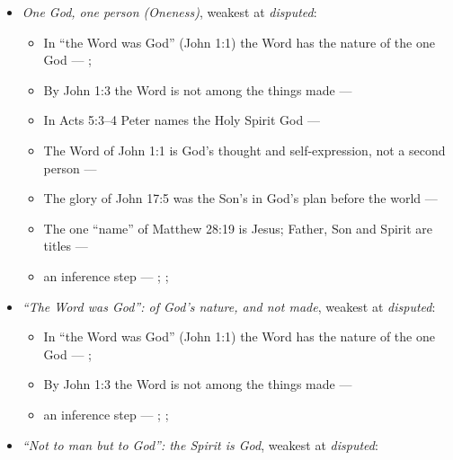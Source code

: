 \documentclass[11pt,paper=\testimonypaper,DIV=13,parskip=false]{scrartcl}
\begin{document}
\begin{itemize}
\item \emph{One God, one person (Oneness)}, weakest at \emph{disputed}:
\begin{itemize}
\item In “the Word was God” (John 1:1) the Word has the nature of the one God --- \cite{harner-qualitative-anarthrous-1973}; \cite[3, The Triune God]{kibbey-living-systematic-theology-2026}
\item By John 1:3 the Word is not among the things made --- \cite[Tractates on John I.11]{schaff-nicene-post-nicene-fathers-1-7}
\item In Acts 5:3–4 Peter names the Holy Spirit God --- \cite[198]{calvin-commentary-acts-1844}
\item The Word of John 1:1 is God’s thought and self-expression, not a second person --- \cite[ch. 4 and 8, on John 1:1]{bernard-oneness-of-god-1983}
\item The glory of John 17:5 was the Son’s in God’s plan before the world --- \cite[ch. 8, The Preexistence of Jesus]{bernard-oneness-of-god-1983}
\item The one “name” of Matthew 28:19 is Jesus; Father, Son and Spirit are titles --- \cite[ch. 6, Matthew 28:19]{bernard-oneness-of-god-1983}
\item an inference step --- \cite[3, The Triune God]{kibbey-living-systematic-theology-2026}; \cite[ch. 4, Conclusion]{bernard-oneness-of-god-1983}; \cite[17--19]{buzzard-caveat-lector-2001}
\end{itemize}
\item \emph{“The Word was God”: of God’s nature, and not made}, weakest at \emph{disputed}:
\begin{itemize}
\item In “the Word was God” (John 1:1) the Word has the nature of the one God --- \cite{harner-qualitative-anarthrous-1973}; \cite[3, The Triune God]{kibbey-living-systematic-theology-2026}
\item By John 1:3 the Word is not among the things made --- \cite[Tractates on John I.11]{schaff-nicene-post-nicene-fathers-1-7}
\item an inference step --- \cite[3, The Triune God]{kibbey-living-systematic-theology-2026}; \cite[ch. 4, Conclusion]{bernard-oneness-of-god-1983}; \cite[17--19]{buzzard-caveat-lector-2001}
\end{itemize}
\item \emph{“Not to man but to God”: the Spirit is God}, weakest at \emph{disputed}:

\end{itemize}
\end{document}
